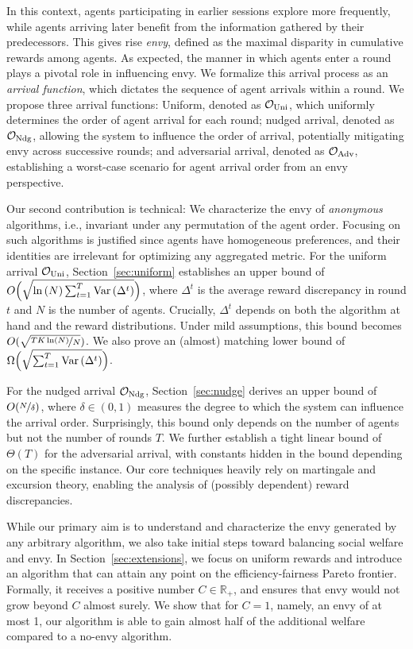 In this context, agents participating in earlier sessions explore more frequently, while agents arriving later benefit from the information gathered by their predecessors.
This gives rise \emph{envy}, defined as the maximal disparity in cumulative rewards among agents. As expected, the manner in which agents enter a round plays a pivotal role in influencing envy.
We formalize this arrival process as an \emph{arrival function}, which dictates the sequence of agent arrivals within a round. We propose three arrival functions: Uniform, denoted as $\mathcal O_{\textnormal{Uni}}$, which uniformly determines the order of agent arrival for each round; nudged arrival, denoted as $\mathcal O_{\textnormal{Ndg}}$, allowing the system to influence the order of arrival, potentially mitigating envy across successive rounds; and adversarial arrival, denoted as $\mathcal O_{\textnormal{Adv}}$, establishing a worst-case scenario for agent arrival order from an envy perspective.

Our second contribution is technical: We characterize the envy of \emph{anonymous} algorithms, i.e., invariant under any permutation of the agent order. Focusing on such algorithms is justified since agents have homogeneous preferences, and their identities are irrelevant for optimizing any aggregated metric. For the uniform arrival $\mathcal O_{\textnormal{Uni}}$, Section~\ref{sec:uniform} establishes an upper bound of $O\Big(\sqrt{\ln{(N)} \sum^{T}_{t=1}{\mathrm{Var}\left( {\Delta^t} \right)} }\Big)$, where $\Delta^t$ is the average reward discrepancy in round $t$ and $N$ is the number of agents. Crucially, $\Delta^t$ depends on both the algorithm at hand and the reward distributions. Under mild assumptions, this bound becomes $O( \sqrt{\nicefrac{TK\ln(N)}{N}})$. We also prove an (almost) matching lower bound of $\Omega\Big(\sqrt{\sum^{T}_{t=1}{\mathrm{Var}\left( {\Delta^t} \right)} }\Big)$. 

For the nudged arrival $\mathcal O_{\textnormal{Ndg}}$, Section~\ref{sec:nudge} derives an upper bound of $O(\nicefrac{N}{\delta})$, where $\delta \in (0,1)$ measures the degree to which the system can influence the arrival order. Surprisingly, this bound only depends on the number of agents but not the number of rounds $T$. We further establish a tight linear bound of $\Theta(T)$ for the adversarial arrival, with constants hidden in the bound depending on the specific instance. Our core techniques heavily rely on martingale and excursion theory, enabling the analysis of (possibly dependent) reward discrepancies. 

While our primary aim is to understand and characterize the envy generated by any arbitrary algorithm, we also take initial steps toward balancing social welfare and envy. In Section~\ref{sec:extensions}, we focus on uniform rewards and introduce an algorithm that can attain any point on the efficiency-fairness Pareto frontier. Formally, it receives a positive number $C \in \mathbb R_{+}$, and ensures that envy would not grow beyond $C$ almost surely. We show that for $C=1$, namely, an envy of at most 1,  our algorithm is able to gain almost half of the additional welfare compared to a no-envy algorithm.

